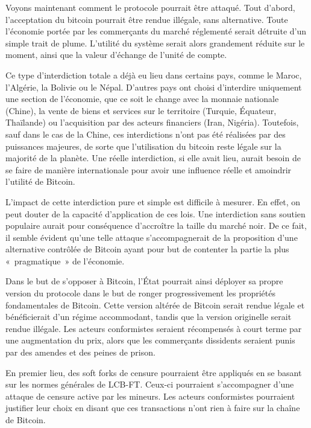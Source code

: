 Voyons maintenant comment le protocole pourrait être attaqué. Tout d'abord, l'acceptation du bitcoin pourrait être rendue illégale, sans alternative. Toute l'économie portée par les commerçants du marché réglementé serait détruite d'un simple trait de plume. L'utilité du système serait alors grandement réduite sur le moment, ainsi que la valeur d'échange de l'unité de compte.

Ce type d'interdiction totale a déjà eu lieu dans certains pays, comme le Maroc, l'Algérie, la Bolivie ou le Népal. D'autres pays ont choisi d'interdire uniquement une section de l'économie, que ce soit le change avec la monnaie nationale (Chine), la vente de biens et services sur le territoire (Turquie, Équateur, Thaïlande) ou l'acquisition par des acteurs financiers (Iran, Nigéria). Toutefois, sauf dans le cas de la Chine, ces interdictions n'ont pas été réalisées par des puissances majeures, de sorte que l'utilisation du bitcoin reste légale sur la majorité de la planète. Une réelle interdiction, si elle avait lieu, aurait besoin de se faire de manière internationale pour avoir une influence réelle et amoindrir l'utilité de Bitcoin.

L'impact de cette interdiction pure et simple est difficile à mesurer. En effet, on peut douter de la capacité d'application de ces lois. Une interdiction sans soutien populaire aurait pour conséquence d'accroître la taille du marché noir. De ce fait, il semble évident qu'une telle attaque s'accompagnerait de la proposition d'une alternative contrôlée de Bitcoin ayant pour but de contenter la partie la plus «~pragmatique~» de l'économie.

Dans le but de s'opposer à Bitcoin, l'État pourrait ainsi déployer sa propre version du protocole dans le but de ronger progressivement les propriétés fondamentales de Bitcoin. Cette version altérée de Bitcoin serait rendue légale et bénéficierait d'un régime accommodant, tandis que la version originelle serait rendue illégale. Les acteurs conformistes seraient récompensés à court terme par une augmentation du prix, alors que les commerçants dissidents seraient punis par des amendes et des peines de prison.

En premier lieu, des soft forks de censure pourraient être appliqués en se basant sur les normes générales de LCB-FT. Ceux-ci pourraient s'accompagner d'une attaque de censure active par les mineurs. Les acteurs conformistes pourraient justifier leur choix en disant que ces transactions n'ont rien à faire sur la chaîne de Bitcoin.

